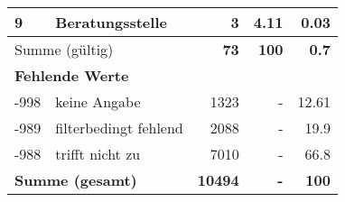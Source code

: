 \begin{longtable}{lXrrr}
     9 &
     \multicolumn{1}{X}{ Beratungsstelle   } &


       \num{3} &
       \num[round-mode=places,round-precision=2]{4,11} &
         \num[round-mode=places,round-precision=2]{0,03} \\
     \midrule
     \multicolumn{2}{l}{Summe (gültig)} &
       \textbf{\num{73}} &
     \textbf{100} &
       \textbf{\num[round-mode=places,round-precision=2]{0,7}} \\
     \multicolumn{5}{l}{\textbf{Fehlende Werte}}\\
       -998 &
       keine Angabe &
         \num{1323} &
        - &
         \num[round-mode=places,round-precision=2]{12,61} \\
       -989 &
       filterbedingt fehlend &
         \num{2088} &
        - &
         \num[round-mode=places,round-precision=2]{19,9} \\
       -988 &
       trifft nicht zu &
         \num{7010} &
        - &
         \num[round-mode=places,round-precision=2]{66,8} \\
     \midrule
     \multicolumn{2}{l}{\textbf{Summe (gesamt)}} &
          \textbf{\num{10494}} &
        \textbf{-} &
        \textbf{100} \\
     \bottomrule
     \end{longtable}
     
